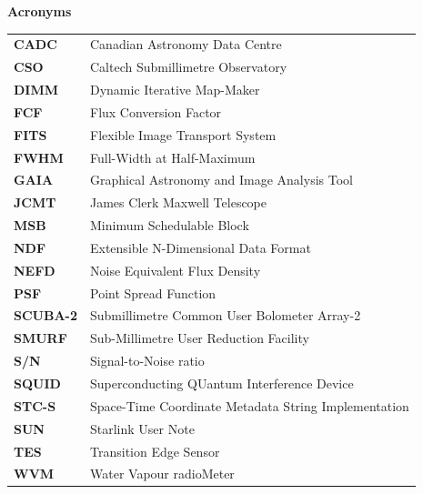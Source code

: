 \documentclass[twoside,11pt]{article}
\newenvironment{latexonly}{}{}
\renewcommand{\_}{\texttt{\symbol{95}}}
\begin{document}
\newpage
\begin{latexonly}
   \vspace{10mm}
   \begin{center}
      {\Large\textbf{Acronyms}}
   \end{center}

\setlength{\extrarowheight}{3pt}
\begin{table}[h!]
\begin{tabular}{ll}
\textbf{CADC}   & Canadian Astronomy Data Centre\\
\textbf{CSO}    & Caltech Submillimetre Observatory\\
\textbf{DIMM}   & Dynamic Iterative Map-Maker\\
\textbf{FCF}    & Flux Conversion Factor\\
\textbf{FITS}   & Flexible Image Transport System\\
\textbf{FWHM}   & Full-Width at Half-Maximum\\
\textbf{GAIA}   & Graphical Astronomy and Image Analysis Tool\\
\textbf{JCMT}   & James Clerk Maxwell Telescope\\
\textbf{MSB}    & Minimum Schedulable Block\\
\textbf{NDF}    & Extensible N-Dimensional Data Format\\
\textbf{NEFD}   & Noise Equivalent Flux Density\\
\textbf{PSF}    & Point Spread Function\\
\textbf{SCUBA-2}& Submillimetre Common User Bolometer Array-2\\
\textbf{SMURF}  & Sub-Millimetre User Reduction Facility\\
\textbf{S/N}    & Signal-to-Noise ratio\\
\textbf{SQUID}  & Superconducting QUantum Interference Device\\
\textbf{STC-S}  & Space-Time Coordinate Metadata String Implementation\\
\textbf{SUN}    & Starlink User Note\\
\textbf{TES}    & Transition Edge Sensor\\
\textbf{WVM}    & Water Vapour radioMeter\\
\end{tabular}
\end{table}

\end{latexonly}
\end{document}
